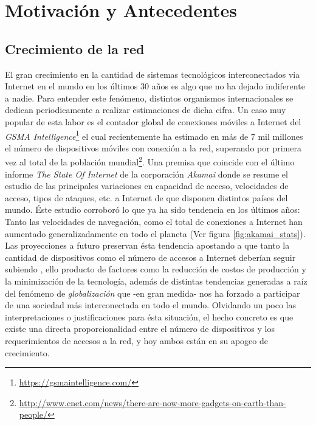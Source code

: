 \chapter{Motivación y Antecedentes}
\section{Crecimiento de la red}
El gran crecimiento en la cantidad de sistemas tecnológicos interconectados via Internet en el mundo en los últimos 30 años es algo que no ha dejado indiferente a nadie. Para entender este fenómeno, distintos organismos internacionales se dedican periodicamente a realizar estimaciones de dicha cifra. Un caso muy popular de esta labor es el contador global de conexiones móviles a Internet del \emph{GSMA Intelligence}\footnote{\url{https://gsmaintelligence.com/}} el cual recientemente ha estimado en más de 7 mil millones el número de dispositivos móviles con conexión a la red, superando por primera vez al total de la población mundial\footnote{\url{http://www.cnet.com/news/there-are-now-more-gadgets-on-earth-than-people/}}. Una premisa que coincide con el último informe \emph{The State Of Internet} de la corporación \emph{Akamai} \cite{report:akamai} donde se resume el estudio de las principales variaciones en capacidad de acceso, velocidades de acceso, tipos de ataques, etc. a Internet de que disponen distintos países del mundo. Éste estudio corroboró lo que ya ha sido tendencia en los últimos años: Tanto las velocidades de navegación, como el total de conexiones a Internet han aumentado generalizadamente en todo el planeta (Ver figura \ref{fig:akamai_stats}). Las proyecciones a futuro preservan ésta tendencia apostando a que tanto la cantidad de dispositivos como el número de accesos a Internet deberían seguir subiendo \cite{nota:2020}, ello producto de factores como la reducción de costos de producción y la minimización de la tecnología, además de distintas tendencias generadas a raíz del fenómeno de \emph{globalización} que -en gran medida- nos ha forzado a participar de una sociedad más interconectada en todo el mundo. Olvidando un poco las interpretaciones o justificaciones para ésta situación, el hecho concreto es que existe una directa proporcionalidad entre el número de dispositivos y los requerimientos de accesos a la red, y hoy ambos están en su apogeo de crecimiento.

